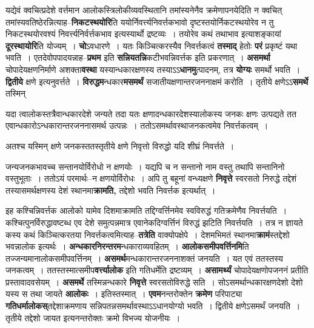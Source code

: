 \documentclass[article,12pt,a4paper]{memoir}
\begin{document}
	  \pstart यद्येवं क्वचित्प्रदेशे वर्त्तमान आलोकस्त्रिलोकीव्यवस्थितानि तमांस्यनेनैव क्रमेणापनयेदिति न क्वचित् तमांस्यवतिष्ठेरन्नित्याह--\textbf{निकटस्थयोरि}ति ययोर्निवर्त्त्यनिवर्त्तकभावो दृष्टस्तयोर्निकटस्थयोरेव न तु निकटस्थयोरवश्यं निवर्त्त्यनिर्वर्त्तकभाव इत्यस्यार्थो द्रष्टव्यः । तयोरेव कथं तथाभाव इत्याशङ्कायां \textbf{दूरस्थायोरि}ति योज्यम् । \textbf{चो}ऽवधारणे । यतः किञ्चित्करस्यैव निवर्त्तकत्वं \textbf{तस्माद्} हेतोः \textbf{परं} प्रकृष्टं यथा भवति । एतदेवोपपादयन्नाह--\textbf{प्रथम} इति \textbf{सन्नियतन्नि}कटीभवन्निवर्त्तक इति प्रकरणात् । \textbf{असमर्था} चोपादेयक्षणनिर्माणे अशक्ता\textbf{वस्था} यस्यान्धकारक्षणस्य तस्याऽऽ\textbf{धानमु}त्पादनम्, तत्र \textbf{योग्यः} समर्थो भवति । \textbf{द्वितीये} क्षणे इत्यनुवर्त्तते । \textbf{विरुद्धम}न्धकार\textbf{मसमर्थं} सजातीयक्षणान्तरजननाक्षमं करोति । तृतीये क्षणेऽऽ\textbf{समर्थे} तस्मिन्  \leavevmode{} 
	  
	यदा त्वालोकस्तत्रैवान्धकारदेशे जन्यते तदा यतः क्षणादन्धकारदेशस्यालोकस्य जनकः क्षणः उत्पद्यते तत एवान्धकारोऽन्धकारान्तरजननासमर्थ उत्पन्नः । ततोऽसमर्थावस्थाजनकत्वमेव निवर्त्तकत्वम् ।  
	  
	अतश्च यस्मिन् क्षणे जनकस्ततस्तृतीये क्षणे निवृत्तो विरुद्धो यदि शीघ्रं निवर्त्तते ।  
	  
	जन्यजनकभावच्च सन्तानयोर्विरोधो न क्षणयोः । यद्यपि च न सन्तानो नाम वस्तु तथापि सन्तानिनो वस्तुभूताः । ततोऽयं परमार्थः--न क्षणयोर्विरोधः । अपि तु बहूनां वन्ध्यक्षणे \textbf{निवृत्ते} स्वरसतो निरुद्धे तद्देशं तस्यासमर्थक्षणस्य देशं स्थानमा\textbf{क्रामति,} तद्देशो भवति निवर्त्तक इत्यर्थात् ।
	\pend
      

	  \pstart इह कश्चिन्निवर्त्तक आलोको यामेव दिशमाक्रामति तद्दिग्वर्त्तिनमेव स्वविरुद्धं गतिक्रमेणैव निवर्त्तयति । कश्चित्पुनर्विरुद्धावष्टब्ध एव देशे समुत्पन्नमात्र एवानेकदिग्वर्त्तिनं विरुद्धं झटिति निवर्त्तयति । तत्र न ज्ञायते कस्य कथं किञ्चित्करतया निवर्त्तकत्वमित्याह--\textbf{तत्रेति} वाक्योपक्षेपे । देशमभिमतं स्थानमा\textbf{क्रामं}स्तद्देशो भवन्नालोक इत्यर्थः । \textbf{अन्धकारनिरन्तरम}न्धकाराव्यवहितम् । \textbf{आलोकसमीपवर्त्तिनमि}ति तज्जन्यमानालोकसमीपवर्त्तिनम् । \textbf{असमर्थ}मन्धकारान्तरजननाशक्तं जनयति । यत एवं ततस्तस्य जनकत्वम् । ततस्तस्मात्समीप\textbf{वर्त्त्यालोक} इति गतिधर्मेति द्रष्टव्यम् । \textbf{असामर्थ्यं} चो\leavevmode{}पादेयक्षणोपजननं प्रतीति प्रस्तावादवसेयम् । \textbf{असमर्थे} तस्मिन्नन्धकारे \textbf{निवृत्ते} स्वरसतोविरुद्धे सति । सोऽसमर्थान्धकारक्षणदेशो देशो यस्य स तथा जायते \textbf{आलोकः} । इतिस्तस्मात् । \textbf{एवम}नन्तरोक्तेन \textbf{क्रमेण} परिपाट्या \textbf{गतिधर्मालोकस्}तद्देशाक्रमणाय सन्निपतन्नसमर्थावस्थाऽऽधानयोग्यो भवति । द्वितीये क्षणेऽसमर्थं जनयति । तृतीये तद्देशो जायत इत्यनन्तरोक्तः क्रमो विभज्य योजनीयः ।
	\pend
      
\end{document}
